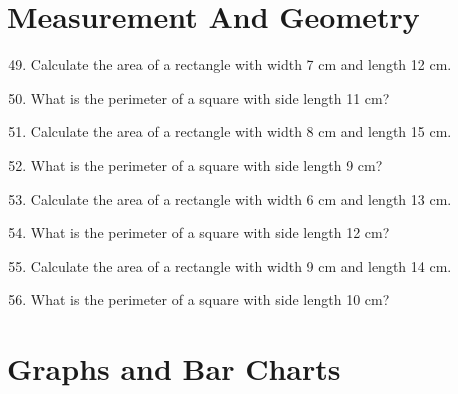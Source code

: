 \documentclass[10pt,a4paper]{article}
\begin{document}
\section*{Measurement And Geometry}

\begin{enumerate}
\setcounter{enumi}{48}
\item Calculate the area of a rectangle with width 7 cm and length 12 cm.
\item What is the perimeter of a square with side length 11 cm?
\item Calculate the area of a rectangle with width 8 cm and length 15 cm.
\item What is the perimeter of a square with side length 9 cm?
\item Calculate the area of a rectangle with width 6 cm and length 13 cm.
\item What is the perimeter of a square with side length 12 cm?
\item Calculate the area of a rectangle with width 9 cm and length 14 cm.
\item What is the perimeter of a square with side length 10 cm?
\end{enumerate}

\section*{Graphs and Bar Charts}
\end{document}
